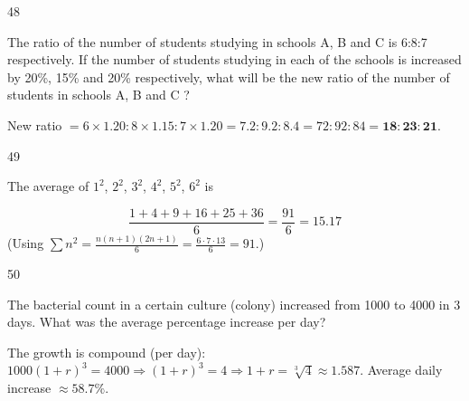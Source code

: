\begin{question}{48}
{The ratio of the number of students studying in schools A, B and C is 6:8:7 respectively. If the number of students studying in each of the schools is increased by 20\%, 15\% and 20\% respectively, what will be the new ratio of the number of students in schools A, B and C ?\par}
\begin{explain}
New ratio $=6\times1.20 : 8\times1.15 : 7\times1.20=7.2:9.2:8.4=72:92:84=\mathbf{18:23:21}$.
\end{explain}
\end{question}

\begin{question}{49}
{The average of $1^{2}$, $2^{2}$, $3^{2}$, $4^{2}$, $5^{2}$, $6^{2}$ is\par}
\begin{explain}
\[\frac{1+4+9+16+25+36}{6}=\frac{91}{6}=\mathbf{15.17}\]
(Using $\sum n^2=\tfrac{n(n+1)(2n+1)}{6}=\tfrac{6\cdot7\cdot13}{6}=91$.)
\end{explain}
\end{question}

\begin{question}{50}
{The bacterial count in a certain culture (colony) increased from 1000 to 4000 in 3 days. What was the average percentage increase per day?\par}
\begin{explain}
The growth is compound (per day): $1000(1+r)^3=4000\Rightarrow(1+r)^3=4\Rightarrow1+r=\sqrt[3]4\approx1.587$.
Average daily increase $\approx\mathbf{58.7\%}$.
\end{explain}
\end{question}
